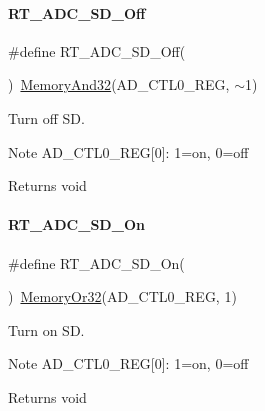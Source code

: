 \paragraph{\texorpdfstring{R\+T\+\_\+\+A\+D\+C\+\_\+\+S\+D\+\_\+\+Off}{RT\_ADC\_SD\_Off}}
{\footnotesize\ttfamily \#define R\+T\+\_\+\+A\+D\+C\+\_\+\+S\+D\+\_\+\+Off(\begin{DoxyParamCaption}{ }\end{DoxyParamCaption})~\mbox{\hyperlink{a00020_ad87cedffcaadc51db22594fce55173d4}{Memory\+And32}}(A\+D\+\_\+\+C\+T\+L0\+\_\+\+R\+EG, $\sim$1)}



Turn off SD. 

\begin{DoxyNote}{Note}
A\+D\+\_\+\+C\+T\+L0\+\_\+\+R\+EG\mbox{[}0\mbox{]}\+: 1=on, 0=off 
\end{DoxyNote}
\begin{DoxyReturn}{Returns}
void 
\end{DoxyReturn}
\mbox{\label{a00002_a3ed6d7d3daccf57a9ee5a9490d8985ad}} 
\paragraph{\texorpdfstring{R\+T\+\_\+\+A\+D\+C\+\_\+\+S\+D\+\_\+\+On}{RT\_ADC\_SD\_On}}
{\footnotesize\ttfamily \#define R\+T\+\_\+\+A\+D\+C\+\_\+\+S\+D\+\_\+\+On(\begin{DoxyParamCaption}{ }\end{DoxyParamCaption})~\mbox{\hyperlink{a00020_a27874a97deab7cecdde5ddecf466e31e}{Memory\+Or32}}(A\+D\+\_\+\+C\+T\+L0\+\_\+\+R\+EG, 1)}



Turn on SD. 

\begin{DoxyNote}{Note}
A\+D\+\_\+\+C\+T\+L0\+\_\+\+R\+EG\mbox{[}0\mbox{]}\+: 1=on, 0=off 
\end{DoxyNote}
\begin{DoxyReturn}{Returns}
void 
\end{DoxyReturn}
\mbox{\label{a00002_acb989d89893ac99af984979cb9e8df2a}} 
